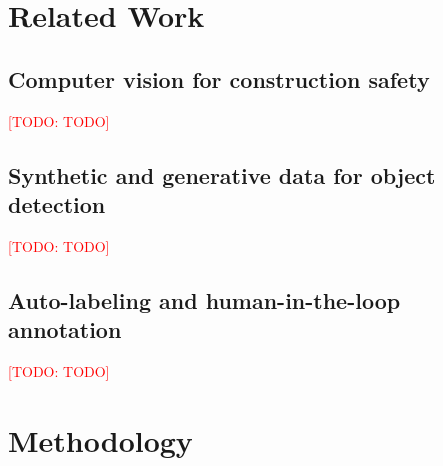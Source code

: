 \documentclass[preprint,12pt]{elsarticle}
\newcommand{\todo}[1]{\textcolor{red}{[TODO: #1]}}
\begin{document}
\section{Related Work}\label{sec:related}

\subsection{Computer vision for construction safety}
\todo{TODO}

\subsection{Synthetic and generative data for object detection}
\todo{TODO}

\subsection{Auto-labeling and human-in-the-loop annotation}
\todo{TODO}

\section{Methodology}\label{sec:method}
\end{document}
